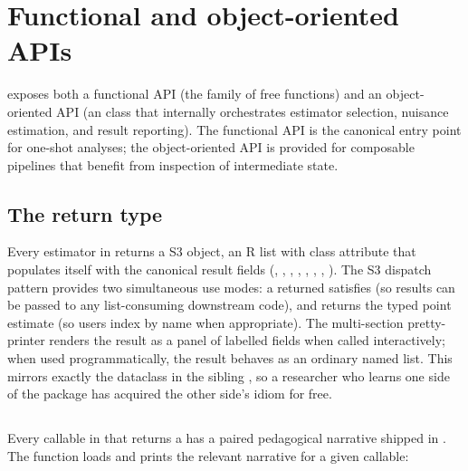 \documentclass[article,shortnames,nojss]{jss}
\begin{document}
\section{Functional and object-oriented APIs}
\label{sec:api}

 exposes both a functional API (the
 family of free functions) and an
object-oriented API (an   class that
internally orchestrates estimator selection, nuisance estimation,
and result reporting). The functional API is the canonical entry
point for one-shot analyses; the object-oriented API is provided
for composable pipelines that benefit from inspection of
intermediate state.

\subsection[The morie result return type]{The  return type}\label{sec:richresult}

Every estimator in  returns a  S3
object, an R list with class attribute  that
populates itself with the canonical result fields
(, , , ,
, , ,
).  The S3 dispatch pattern provides two
simultaneous use modes: a returned  satisfies
 (so results can be passed to any
list-consuming downstream code), and 
returns the typed point estimate (so users index by name when
appropriate).  The multi-section pretty-printer
 renders the result as a panel of
labelled fields when called interactively; when used
programmatically, the result behaves as an ordinary named list.
This mirrors exactly the  dataclass in the
 sibling \citep{Ruhela2026MoriePy}, so a
researcher who learns one side of the package has acquired the
other side's idiom for free.

\subsection[describe()]{}\label{sec:describe}

Every callable in  that returns a 
has a paired  pedagogical narrative
shipped in .  The 
function loads and prints the relevant narrative for a given
callable:
\end{document}
